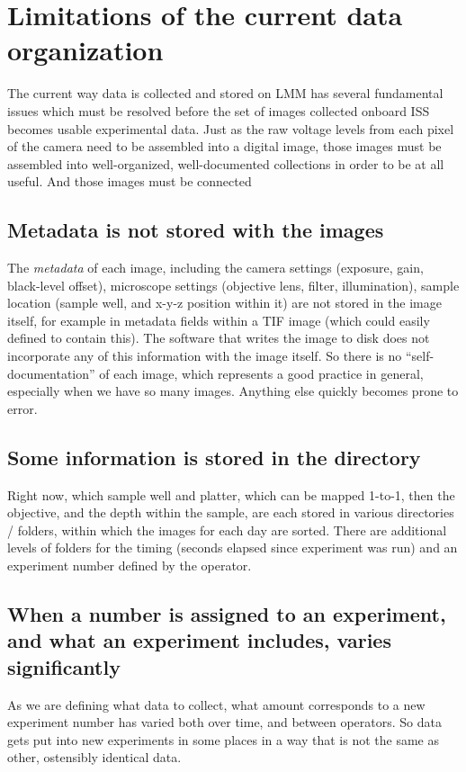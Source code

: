 \section{Limitations of the current data organization}\hypertarget{limitations-of-the-current-data-organization}{}\label{limitations-of-the-current-data-organization}
The current way data is collected and stored on LMM has several fundamental
issues which must be resolved before the set of images collected onboard ISS
becomes usable experimental data. Just as the raw voltage levels from each pixel
of the camera need to be assembled into a digital image, those images must be
assembled into well-organized, well-documented collections in order to be at all
useful. And those images must be connected

\subsection{Metadata is not stored with the images}\hypertarget{metadata-is-not-stored-with-the-images}{}\label{metadata-is-not-stored-with-the-images}
The \emph{metadata} of each image, including the camera settings (exposure,
gain, black-level offset), microscope settings (objective lens, filter,
illumination), sample location (sample well, and x-y-z position within it) are
not stored in the image itself, for example in metadata fields within a TIF
image (which could easily defined to contain this). The software that writes the
image to disk does not incorporate any of this information with the image
itself. So there is no ``self-documentation'' of each image, which represents a
good practice in general, especially when we have so many images. Anything else
quickly becomes prone to error.

\subsection{Some information is stored in the directory}\hypertarget{some-information-is-stored-in-the-directory}{}\label{some-information-is-stored-in-the-directory}
Right now, which sample well and platter, which can be mapped 1-to-1, then the objective, and
the depth within the sample, are each stored in various directories / folders,
within which the images for each day are sorted. There are additional levels of
folders for the timing (seconds elapsed since experiment was run) and an
experiment number defined by the operator.

\subsection{When a number is assigned to an experiment, and what an experiment includes, varies significantly}\hypertarget{when-a-number-is-assigned-to-an-experiment-and-what-an-experiment-includes-varies-significantly}{}\label{when-a-number-is-assigned-to-an-experiment-and-what-an-experiment-includes-varies-significantly}
As we are defining what data to collect, what amount corresponds to a new
experiment number has varied both over time, and between operators. So data gets
put into new experiments in some places in a way that is not the same as other,
ostensibly identical data.

